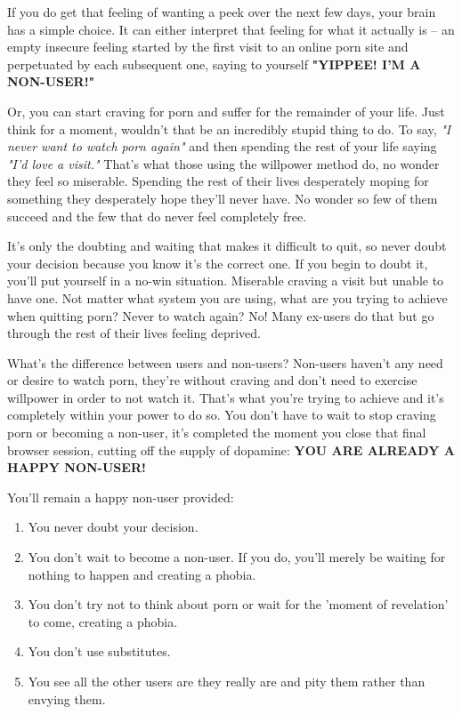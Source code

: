 \documentclass[easypeasy.tex]{subfiles}
\begin{document}
If you do get that feeling of wanting a peek over the next few days, your brain has a simple choice. It can either interpret that feeling for what it actually is -- an empty insecure feeling started by the first visit to an online porn site and perpetuated by each subsequent one, saying to yourself \textbf{"YIPPEE! I'M A NON-USER!"}

Or, you can start craving for porn and suffer for the remainder of your life. Just think for a moment, wouldn't that be an incredibly stupid thing to do. To say, \textit{"I never want to watch porn again"} and then spending the rest of your life saying \textit{"I'd love a visit."} That's what those using the willpower method do, no wonder they feel so miserable. Spending the rest of their lives desperately moping for something they desperately hope they'll never have. No wonder so few of them succeed and the few that do never feel completely free.

It's only the doubting and waiting that makes it difficult to quit, so never doubt your decision because you know it's the correct one. If you begin to doubt it, you'll put yourself in a no-win situation. Miserable craving a visit but unable to have one. Not matter what system you are using, what are you trying to achieve when quitting porn? Never to watch again? No! Many ex-users do that but go through the rest of their lives feeling deprived.

What's the difference between users and non-users? Non-users haven't any need or desire to watch porn, they're without craving and don't need to exercise willpower in order to not watch it. That's what you're trying to achieve and it's completely within your power to do so. You don't have to wait to stop craving porn or becoming a non-user, it's completed the moment you close that final browser session, cutting off the supply of dopamine: \textbf{YOU ARE ALREADY A HAPPY NON-USER!}

  You'll remain a happy non-user provided:
\begin{enumerate}
  \item You never doubt your decision.
  \item You don't wait to become a non-user. If you do, you'll merely be waiting for nothing to happen and creating a phobia.
  \item You don't try not to think about porn or wait for the 'moment of revelation' to come, creating a phobia.
  \item You don't use substitutes.
  \item You see all the other users are they really are and pity them rather than envying them.
\end{enumerate}
  
\end{document}
